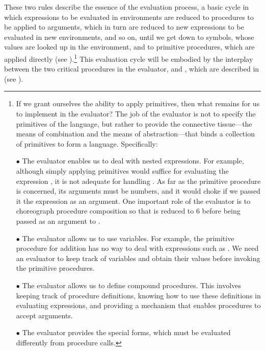\noindent
These two rules describe the essence of the evaluation process, a basic cycle
in which expressions to be evaluated in environments are reduced to procedures
to be applied to arguments, which in turn are reduced to new expressions to be
evaluated in new environments, and so on, until we get down to symbols, whose
values are looked up in the environment, and to primitive procedures, which are
applied directly (see ).\footnote{If we grant ourselves the
ability to apply primitives, then what remains for us to implement in the
evaluator?  The job of the evaluator is not to specify the primitives of the
language, but rather to provide the connective tissue---the means of
combination and the means of abstraction---that binds a collection of
primitives to form a language. Specifically:

\( \bullet \) The evaluator enables us to deal with nested expressions.  For example,
although simply applying primitives would suffice for evaluating the expression
, it is not adequate for handling .  As far
as the primitive procedure \code{+} is concerned, its arguments must be
numbers, and it would choke if we passed it the expression  as an
argument.  One important role of the evaluator is to choreograph procedure
composition so that  is reduced to 6 before being passed as an
argument to \code{+}.

\( \bullet \) The evaluator allows us to use variables.  For example, the primitive procedure
for addition has no way to deal with expressions such as .  We
need an evaluator to keep track of variables and obtain their values before
invoking the primitive procedures.

\( \bullet \) The evaluator allows us to define compound procedures.  This involves keeping
track of procedure definitions, knowing how to use these definitions in
evaluating expressions, and providing a mechanism that enables procedures to
accept arguments.

\( \bullet \) The evaluator provides the special forms, which must be evaluated differently
from procedure calls.}
This evaluation cycle will be embodied by the interplay between the two
critical procedures in the evaluator,  and , which are
described in  (see ).

